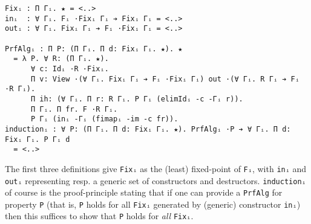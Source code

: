 \documentclass{article}
\begin{document}
\begin{verbatim}
Fixᵢ : Π Γᵢ. ★ = <..>
inᵢ  : ∀ Γᵢ. Fᵢ ·Fixᵢ Γᵢ ➔ Fixᵢ Γᵢ = <..>
outᵢ : ∀ Γᵢ. Fixᵢ Γᵢ ➔ Fᵢ ·Fixᵢ Γᵢ = <..>

PrfAlgᵢ : Π P: (Π Γᵢ. Π d: Fixᵢ Γᵢ. ★). ★
  = λ P. ∀ R: (Π Γᵢ. ★).
      ∀ c: Idᵢ ·R ·Fixᵢ.
      Π v: View ·(∀ Γᵢ. Fixᵢ Γᵢ ➔ Fᵢ ·Fixᵢ Γᵢ) out ·(∀ Γᵢ. R Γᵢ ➔ Fᵢ ·R Γᵢ).
      Π ih: (∀ Γᵢ. Π r: R Γᵢ. P Γᵢ (elimIdᵢ -c -Γᵢ r)).
      Π Γᵢ. Π fr. F ·R Γᵢ.
      P Γᵢ (inᵢ -Γᵢ (fimapᵢ -im -c fr)).
inductionᵢ : ∀ P: (Π Γᵢ. Π d: Fixᵢ Γᵢ. ★). PrfAlgᵢ ·P ➔ ∀ Γᵢ. Π d: Fixᵢ Γᵢ. P Γᵢ d
  = <..>
\end{verbatim}

The first three definitions give \verb;Fixᵢ; as the (least) fixed-point of
\verb;Fᵢ;, with \verb;inᵢ; and \verb;outᵢ; representing resp. a generic set of
constructors and destructors. \verb;inductionᵢ; of course is the proof-principle
stating that if one can provide a \verb;PrfAlg; for property \verb;P; (that is,
\verb;P; holds for all \verb;Fixᵢ; generated by (generic) constructor
\verb;inᵢ;) then this suffices to show that \verb;P; holds for \textit{all}
\verb;Fixᵢ;.
\end{document}
